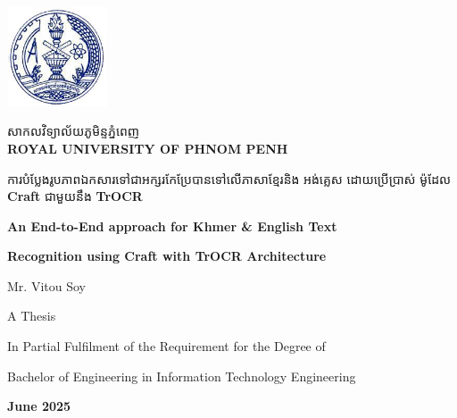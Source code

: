 \begin{titlepage}
    \centering
    \vspace*{1cm}

    \begin{minipage}{0.25\textwidth}
        \includegraphics[height=2.93cm,width=2.98cm]{figures/RUPP.jpg}
    \end{minipage}
    \hfill
    \begin{minipage}{0.65\textwidth}
        \raggedright
        {\khmerfont\fontsize{16pt}{20pt}\selectfont សាកលវិទ្យាល័យភូមិន្ទភ្នំពេញ\\[0.6em]}
        {\englishfont\fontsize{12.5pt}{20pt}\selectfont\bfseries\textbf{ROYAL UNIVERSITY OF PHNOM PENH}}
    \end{minipage}

    \vspace{2cm}

    \begin{minipage}{0.9\textwidth}
        \centering
        {\khmerfont\fontsize{12pt}{20pt}\selectfont ការបំប្លែងរូបភាពឯកសារទៅជាអក្សរកែប្រែបានទៅលើភាសាខ្មែរនិង អង់គ្លេស ដោយប្រើប្រាស់ ម៉ូដែល {\englishfont\textbf{Craft}} ជាមួយនឹង {\englishfont\textbf{TrOCR}}\\[0.4em]}
        {\englishfont\fontsize{15pt}{20pt}\selectfont\bfseries An End-to-End approach for Khmer \& English Text \par}
        {\englishfont\fontsize{15pt}{20pt}\selectfont\bfseries Recognition using Craft with TrOCR Architecture \par}
    \end{minipage}

    \vspace{3.0cm}

    {\englishfont\fontsize{16pt}{20pt}\selectfont Mr. Vitou Soy\par}

    \vspace{3.0cm}

    {\englishfont\fontsize{16pt}{20pt}\selectfont A Thesis\par}
    \vspace{0.5cm}
    {\large In Partial Fulfilment of the Requirement for the Degree of\par}
    {\large Bachelor of Engineering in Information Technology Engineering\par}

    \vspace{2.5cm}


    \vfill
    {\Large\bfseries June 2025\par}
\end{titlepage}


